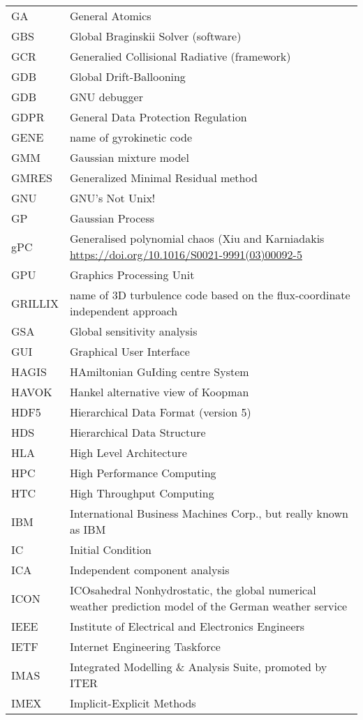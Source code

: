 \begin{longtable}{|p{4.0cm}|p{12.0cm}|}
GA & General Atomics \\
GBS & Global Braginskii Solver (software)\\
GCR & Generalied Collisional Radiative (framework) \\
GDB & Global Drift-Ballooning \\
GDB & GNU debugger \\
GDPR & General Data Protection Regulation \\
GENE & name of gyrokinetic code \\
GMM  & Gaussian mixture model \\
GMRES & Generalized Minimal Residual method \\
GNU & GNU's Not Unix! \\
GP & Gaussian Process \\
gPC & Generalised polynomial chaos (Xiu and Karniadakis \url{https://doi.org/10.1016/S0021-9991(03)00092-5} \\
GPU & Graphics Processing Unit \\
GRILLIX & name of 3D turbulence code based on the flux-coordinate independent approach \\
GSA & Global sensitivity analysis \\
GUI & Graphical User Interface \\
HAGIS & HAmiltonian GuIding centre System\\
HAVOK  & Hankel alternative view of Koopman \\
HDF5 & Hierarchical Data Format (version 5) \\
HDS & Hierarchical Data Structure \\
HLA & High Level Architecture\\
HPC & High Performance Computing \\
HTC & High Throughput Computing \\
IBM & International Business Machines Corp., but really known as IBM \\
IC & Initial Condition \\
ICA  & Independent component analysis \\
ICON & ICOsahedral Nonhydrostatic, the global numerical weather prediction model of the German weather service \\
IEEE & Institute of Electrical and Electronics Engineers \\
IETF & Internet Engineering Taskforce \\
IMAS & Integrated Modelling \& Analysis Suite, promoted by ITER \\
IMEX & Implicit-Explicit Methods \\

\end{longtable}
